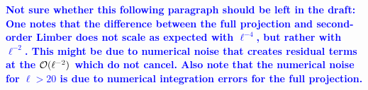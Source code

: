 \documentclass[fleqn,usenatbib]{mnras} %
\newcommand{\mk}[1]{{\bf\textcolor{blue}{#1}}}
\begin{document}
\mk{Not sure whether this following paragraph should be left in the draft: One
notes that the difference between the full projection and second-order Limber
does not scale as expected with $\ell^{-4}$, but rather with $\ell^{-2}$. This
might be due to numerical noise that creates residual terms at the ${\cal
O}(\ell^{-2})$ which do not cancel. Also note that the numerical noise for
$\ell > 20$ is due to numerical integration errors for the full projection.}


\begin{figure}

  \begin{center}
  \end{center}


\end{figure}
\end{document}
